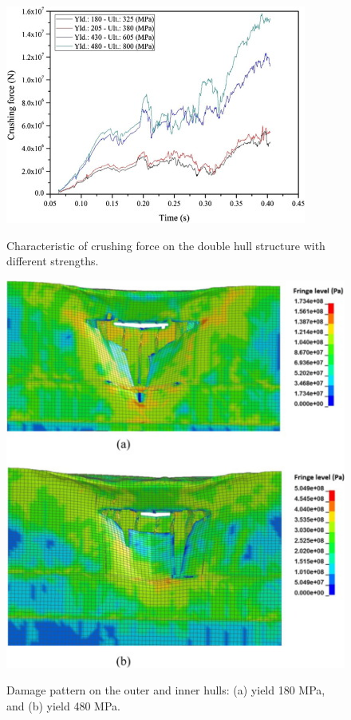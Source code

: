 \documentclass[../Final.tex]{subfiles}
\begin{document}
\begin{figure}[h]
    \centering
    \includegraphics[width=\columnwidth]{fig10.jpg}
    \label{fig10}
    \caption{Characteristic of crushing force on the double hull structure with different strengths.}
\end{figure}

\begin{figure}[h]
    \centering
    \includegraphics[width=\columnwidth]{fig11.jpg}
    \label{fig11}
    \caption{ Damage pattern on the outer and inner hulls: (a) yield 180 MPa, and (b) yield 480 MPa.}
\end{figure}
\end{document}
